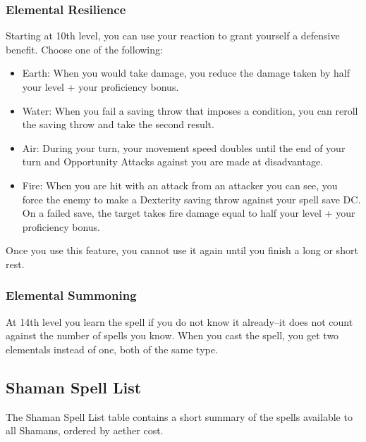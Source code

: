 \subsubsection{Elemental Resilience}
Starting at 10th level, you can use your reaction to grant yourself a defensive benefit. Choose one of the following:
\begin{itemize}
	\item Earth: When you would take damage, you reduce the damage taken by half your level + your proficiency bonus.
	\item Water: When you fail a saving throw that imposes a condition, you can reroll the saving throw and take the second result.
	\item Air: During your turn, your movement speed doubles until the end of your turn and Opportunity Attacks against you are made at disadvantage.
	\item Fire: When you are hit with an attack from an attacker you can see, you force the enemy to make a Dexterity saving throw against your spell save DC. On a failed save, the target takes fire damage equal to half your level + your proficiency bonus.
\end{itemize}

Once you use this feature, you cannot use it again until you finish a long or short rest.

\subsubsection{Elemental Summoning}
At 14th level you learn the  spell if you do not know it already--it does not count against the number of spells you know. When you cast the spell, you get two elementals instead of one, both of the same type.

\subsection{Shaman Spell List}
The Shaman Spell List table contains a short summary of the spells available to all Shamans, ordered by aether cost.


